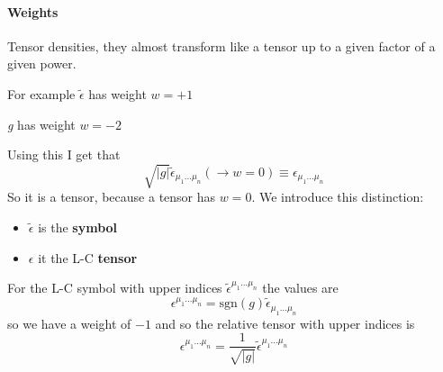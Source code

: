 \paragraph{Weights}
Tensor densities, they almost transform like a tensor up to a given factor of a given power. \par
For example $\tilde{\epsilon }$ has weight $w=+1$\par
\emph{g} has weight $w=-2$\par
Using this I get that
\[
	\sqrt{|g|} \tilde{\epsilon }_{\mu _{1}\ldots \mu_{n}} (\to w=0) \equiv \epsilon_{\mu_{1}\ldots  \mu _{n}}
\]
So it is a tensor, because a tensor has $w=0$. 
We introduce this distinction:
\begin{itemize}
	\item $\tilde{\epsilon }$ is the \textbf{symbol}
	\item $\epsilon $ it the L-C \textbf{tensor} 
\end{itemize}

For the L-C symbol with upper indices $\tilde{\epsilon}^{\mu _{1}\ldots \mu _{n}}$ the values are
\[
	\epsilon ^{\mu _{1}\ldots \mu _{n}} = \text{sgn}\left( g \right) \tilde{\epsilon }_{\mu _{1}\ldots \mu _{n}}
\]
so we have a weight of $-1$ and so the relative tensor with upper indices is 
\[
	\epsilon ^{\mu _{1}\ldots \mu _{n}} = \frac{1}{\sqrt{|g|}} \tilde{\epsilon }^{\mu _{1}\ldots \mu _{n}}
\]



